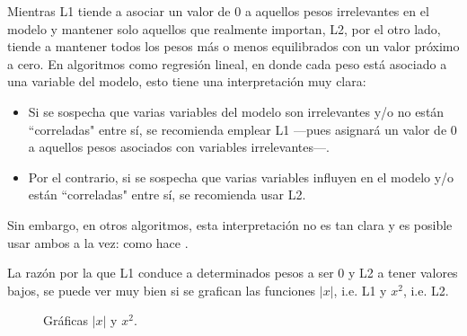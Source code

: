Mientras L1 tiende a asociar un valor de $0$ a aquellos pesos irrelevantes en el modelo y mantener solo aquellos que realmente importan, L2, por el otro lado, tiende a mantener todos los pesos más o menos equilibrados con un valor próximo a cero. En algoritmos como regresión lineal, en donde cada peso está asociado a una variable del modelo, esto tiene una interpretación muy clara:
\begin{itemize}
    \item Si se sospecha que varias variables del modelo son irrelevantes y/o no están ``correladas" entre sí, se recomienda emplear L1 ---pues asignará un valor de $0$ a aquellos pesos asociados con variables irrelevantes---.
    \item Por el contrario, si se sospecha que varias variables influyen en el modelo y/o están ``correladas" entre sí, se recomienda usar L2.
\end{itemize}

Sin embargo, en otros algoritmos, esta interpretación no es tan clara y es posible usar ambos a la vez: como hace .

La razón por la que L1 conduce a determinados pesos a ser $0$ y L2 a tener valores bajos, se puede ver muy bien si se grafican las funciones $|x|$, i.e. L1 y $x^2$, i.e. L2. 

\begin{figure}[H]
    \centering
    \caption{Gráficas $|x|$ y $x^2$.}
    \label{L1L2}
\end{figure}

